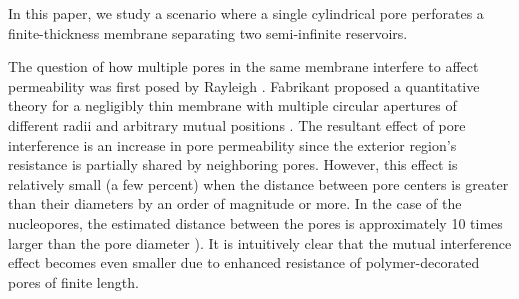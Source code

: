 \documentclass[12pt, a4paper]{article}
\begin{document}



In this paper, we study a scenario where a single cylindrical pore perforates a finite-thickness membrane separating two semi-infinite reservoirs.

The question of how multiple pores in the same membrane interfere to affect permeability was first posed by Rayleigh \cite{Strutt1878}.
Fabrikant proposed a quantitative theory for a negligibly thin membrane with multiple circular apertures of different radii and arbitrary mutual positions \cite{Fabrikant1985}.
The resultant effect of pore interference is an increase in pore permeability since the exterior region's resistance is partially shared by neighboring pores.
However, this effect is relatively small (a few percent) when the distance between pore centers is greater than their diameters by an order of magnitude or more. In the case of the nucleopores, the estimated distance between the pores is approximately 10 times larger than the pore diameter \cite{Yang2004, Daigle2001, Feldherr1984, Kubitscheck2000}). 
It is intuitively clear that the mutual interference effect becomes even smaller due to enhanced resistance of polymer-decorated pores of finite  length.
\printbibliography
\end{document}
